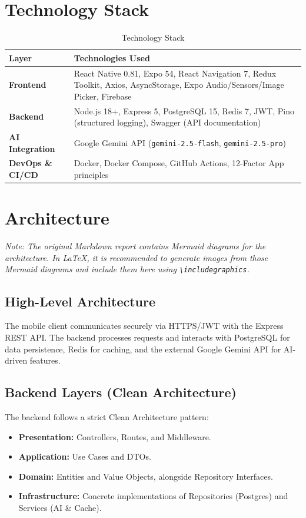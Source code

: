 \documentclass[12pt,a4paper]{article}
\begin{document}
\section{Technology Stack}

\begin{table}[H]
\centering
\begin{tabular}{@{}p{3cm} p{12cm}@{}}
\toprule
\textbf{Layer} & \textbf{Technologies Used} \\ \midrule
\textbf{Frontend} & React Native 0.81, Expo 54, React Navigation 7, Redux Toolkit, Axios, AsyncStorage, Expo Audio/Sensors/Image Picker, Firebase \\ \addlinespace
\textbf{Backend} & Node.js 18+, Express 5, PostgreSQL 15, Redis 7, JWT, Pino (structured logging), Swagger (API documentation) \\ \addlinespace
\textbf{AI Integration} & Google Gemini API (\texttt{gemini-2.5-flash}, \texttt{gemini-2.5-pro}) \\ \addlinespace
\textbf{DevOps \& CI/CD} & Docker, Docker Compose, GitHub Actions, 12-Factor App principles \\ \bottomrule
\end{tabular}
\caption{Technology Stack}
\end{table}

\section{Architecture}

\textit{Note: The original Markdown report contains Mermaid diagrams for the architecture. In LaTeX, it is recommended to generate images from those Mermaid diagrams and include them here using \texttt{\textbackslash includegraphics}.}

\subsection{High-Level Architecture}
The mobile client communicates securely via HTTPS/JWT with the Express REST API. The backend processes requests and interacts with PostgreSQL for data persistence, Redis for caching, and the external Google Gemini API for AI-driven features.

\subsection{Backend Layers (Clean Architecture)}
The backend follows a strict Clean Architecture pattern:
\begin{itemize}
    \item \textbf{Presentation:} Controllers, Routes, and Middleware.
    \item \textbf{Application:} Use Cases and DTOs.
    \item \textbf{Domain:} Entities and Value Objects, alongside Repository Interfaces.
    \item \textbf{Infrastructure:} Concrete implementations of Repositories (Postgres) and Services (AI \& Cache).
\end{itemize}
\end{document}
